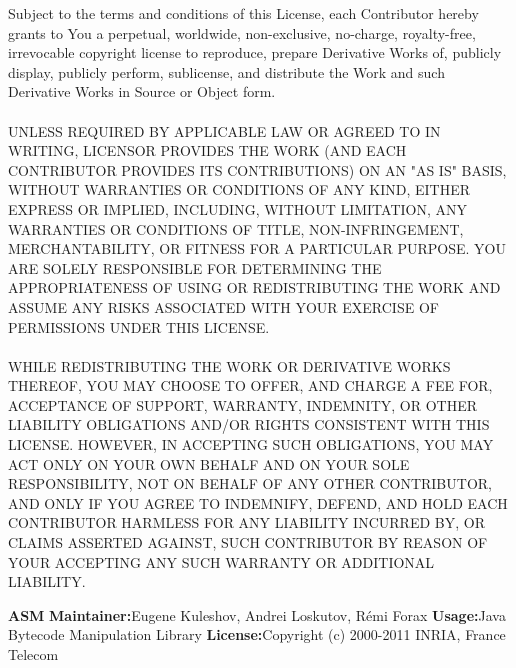 \newline
\begin{addmargin}[4.5em]{0em}
    \fontsize{10pt}{12pt}\selectfont
    Subject to the terms and conditions of this License, each Contributor hereby grants to
    You a perpetual, worldwide, non-exclusive, no-charge, royalty-free, irrevocable copyright
    license to reproduce, prepare Derivative Works of, publicly display, publicly perform,
    sublicense, and distribute the Work and such Derivative Works in Source or Object form.
    \\ \\
    \uppercase{Unless required by applicable law or agreed to in writing,
    Licensor provides the Work (and each Contributor provides its Contributions)
    on an "AS IS" BASIS, WITHOUT WARRANTIES OR CONDITIONS OF ANY KIND, either express
    or implied, including, without limitation, any warranties or conditions of TITLE,
    NON-INFRINGEMENT, MERCHANTABILITY, or FITNESS FOR A PARTICULAR PURPOSE. You are
    solely responsible for determining the appropriateness of using or redistributing
    the Work and assume any risks associated with Your exercise of permissions under
    this License.
    \\ \\
    While redistributing the Work or Derivative Works thereof, You may choose to offer,
    and charge a fee for, acceptance of support, warranty, indemnity, or other liability
    obligations and/or rights consistent with this License. However, in accepting such
    obligations, You may act only on Your own behalf and on Your sole responsibility,
    not on behalf of any other Contributor, and only if You agree to indemnify, defend,
    and hold each Contributor harmless for any liability incurred by, or claims asserted
    against, such Contributor by reason of your accepting any such warranty or additional
    liability.}
\end{addmargin}
\newpage
{\bfseries ASM}
\newline
\newline
{\bfseries Maintainer:}{\space Eugene Kuleshov, Andrei Loskutov, Rémi Forax}
\newline
\newline
{\bfseries Usage:}{\space Java Bytecode Manipulation Library}
\newline
\newline
{\bfseries License:}{\space Copyright (c) 2000-2011 INRIA, France Telecom}
\newline
